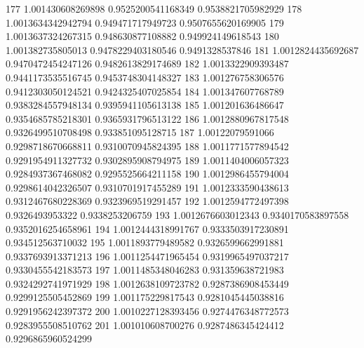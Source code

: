 177	1.001430608269898	0.9525200541168349	0.9538821705982929
178	1.0013634342942794	0.949471717949723	0.9507655620169905
179	1.0013637324267315	0.948630877108882	0.949924149618543
180	1.001382735805013	0.9478229403180546	0.9491328537846
181	1.0012824435692687	0.9470472454247126	0.9482613829174689
182	1.0013322909393487	0.9441173535516745	0.9453748304148327
183	1.001276758306576	0.9412303050124521	0.9424325407025854
184	1.001347607768789	0.9383284557948134	0.9395941105613138
185	1.001201636486647	0.9354685785218301	0.9365931796513122
186	1.0012880967817548	0.9326499510708498	0.933851095128715
187	1.00122079591066	0.9298718670668811	0.9310070945824395
188	1.0011771577894542	0.9291954911327732	0.9302895908794975
189	1.0011404006057323	0.9284937367468082	0.9295525664211158
190	1.0012986455794004	0.9298614042326507	0.9310701917455289
191	1.0012333590438613	0.9312467680228369	0.9323969519291457
192	1.0012594772497398	0.9326493953322	0.9338253206759
193	1.0012676603012343	0.9340170583897558	0.9352016254658961
194	1.0012444318991767	0.9333503917230891	0.934512563710032
195	1.0011893779489582	0.9326599662991881	0.9337693913371213
196	1.0011254471965454	0.9319965497037217	0.9330455542183573
197	1.0011485348046283	0.931359638721983	0.9324292741971929
198	1.0012638109723782	0.9287386908453449	0.9299125505452869
199	1.001175229817543	0.9281045445038816	0.9291956242397372
200	1.0010227128393456	0.9274476348772573	0.9283955508510762
201	1.001010608700276	0.9287486345424412	0.9296865960524299
